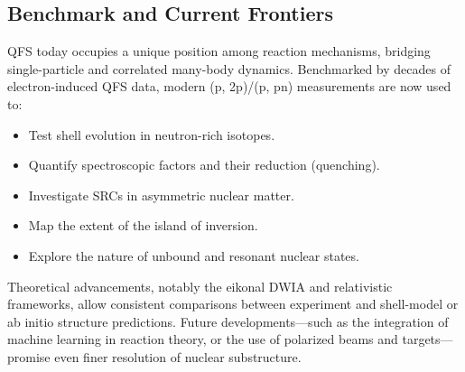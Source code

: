 \subsection{Benchmark and Current Frontiers}

\gls{QFS} today occupies a unique position among reaction mechanisms, bridging single-particle and correlated many-body dynamics. Benchmarked by decades of electron-induced \gls{QFS} data, modern (p, 2p)/(p, pn) measurements are now used to:

\begin{itemize}
	\item Test shell evolution in neutron-rich isotopes.
	\item Quantify spectroscopic factors and their reduction (quenching).
	\item Investigate SRCs in asymmetric nuclear matter.
	\item Map the extent of the island of inversion.
	\item Explore the nature of unbound and resonant nuclear states.
\end{itemize}

Theoretical advancements, notably the eikonal DWIA and relativistic frameworks, allow consistent comparisons between experiment and shell-model or ab initio structure predictions. Future developments—such as the integration of machine learning in reaction theory, or the use of polarized beams and targets—promise even finer resolution of nuclear substructure.


%



